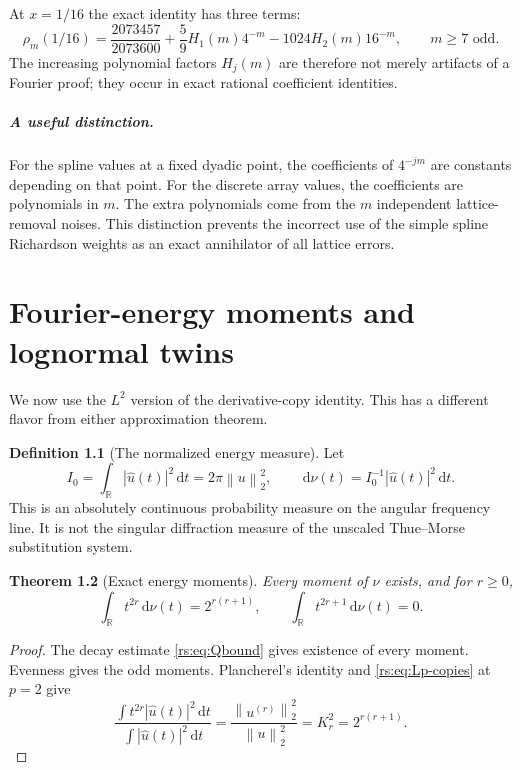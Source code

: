 \documentclass[11pt,a4paper,oneside,openany]{book}
\numberwithin{equation}{chapter}
\newtheorem{theorem}{Theorem}[chapter]
\theoremstyle{definition}
\newtheorem{definition}[theorem]{Definition}
\theoremstyle{remark}
\newcommand{\R}{\mathbb R}
\newcommand{\dd}{\,\mathrm d}
\newcommand{\norm}[1]{\left\lVert #1\right\rVert}
\begin{document}
At $x=1/16$ the exact identity has three terms:
\begin{equation}
 \rho_m(1/16)=\frac{2073457}{2073600}
       +\frac59H_1(m)4^{-m}
       -1024H_2(m)16^{-m},
 \qquad m\geq7\text{ odd}.
 \label{rs:eq:sixteenth-lattice}
\end{equation}
The increasing polynomial factors $H_j(m)$ are therefore not
merely artifacts of a Fourier proof; they occur in exact rational
coefficient identities.

\paragraph{A useful distinction.}
For the spline values at a fixed dyadic point, the coefficients of
$4^{-jm}$ are constants depending on that point. For the discrete
array values, the coefficients are polynomials in $m$. The extra
polynomials come from the $m$ independent lattice-removal noises.
This distinction prevents the incorrect use of the simple spline
Richardson weights as an exact annihilator of all lattice errors.
\chapter{Fourier-energy moments and lognormal twins}\label{rs:sec:spectral}

We now use the $L^2$ version of the derivative-copy identity. This
has a different flavor from either approximation theorem.

\begin{definition}[The normalized energy measure]
Let
\begin{equation}
 I_0=\int_{\R}|\widehat u(t)|^2\dd t=2\pi\norm{u}_2^2,
 \qquad \dd\nu(t)=I_0^{-1}|\widehat u(t)|^2\dd t.
 \label{rs:eq:nu-def}
\end{equation}
This is an absolutely continuous probability measure on the angular
frequency line. It is not the singular diffraction measure of the
unscaled Thue--Morse substitution system.
\end{definition}

\begin{theorem}[Exact energy moments]\label{rs:thm:energy-moments}
Every moment of $\nu$ exists, and for $r\geq0$,
\begin{equation}
 \int_{\R}t^{2r}\dd\nu(t)=2^{r(r+1)},\qquad
 \int_{\R}t^{2r+1}\dd\nu(t)=0.
 \label{rs:eq:energy-moments}
\end{equation}
\end{theorem}
\begin{proof}
The decay estimate \eqref{rs:eq:Qbound} gives existence of every
moment. Evenness gives the odd moments. Plancherel's identity and
\eqref{rs:eq:Lp-copies} at $p=2$ give
\begin{equation}
 \frac{\int t^{2r}|\widehat u(t)|^2\dd t}{\int|\widehat u(t)|^2\dd t}
 =\frac{\norm{u^{(r)}}_2^2}{\norm{u}_2^2}
 =K_r^2=2^{r(r+1)}.
\end{equation}
\end{proof}
\end{document}
